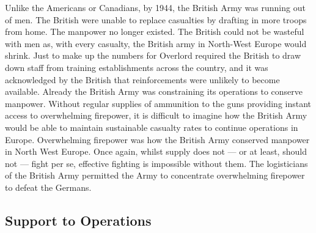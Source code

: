 \documentclass[noraggedright]{turabian-researchpaper}
\begin{document}
Unlike the Americans or Canadians, by 1944, the British Army was running out 
of men.  The British were unable to replace casualties by drafting in more 
troops from home.  The manpower no longer existed.  The British 
could not be wasteful with men as, with every casualty, the British army in 
North-West Europe would shrink.\autocite[5]{cracks}  Just to make up the 
numbers for Overlord required the British to draw down staff from training 
establishments across the country, and it was acknowledged by the British 
that reinforcements were unlikely to become available.\autocite[50-2]
{cracks} Already the British Army was constraining its operations to 
conserve manpower.\autocite[69-70]{cracks}  %
Without regular supplies of ammunition to the guns providing instant access 
to overwhelming firepower, it is difficult to imagine how the British Army 
would be able to maintain sustainable casualty rates to continue operations 
in Europe.  Overwhelming firepower was how the British Army conserved 
manpower in North West Europe.  Once again, whilst supply does not --- or at 
least, should not --- fight per se, effective fighting is impossible without 
them.  The logisticians of the British Army permitted the Army to concentrate 
overwhelming firepower to defeat the Germans.


	\subsection{Support to Operations}
		



		
\end{document}
